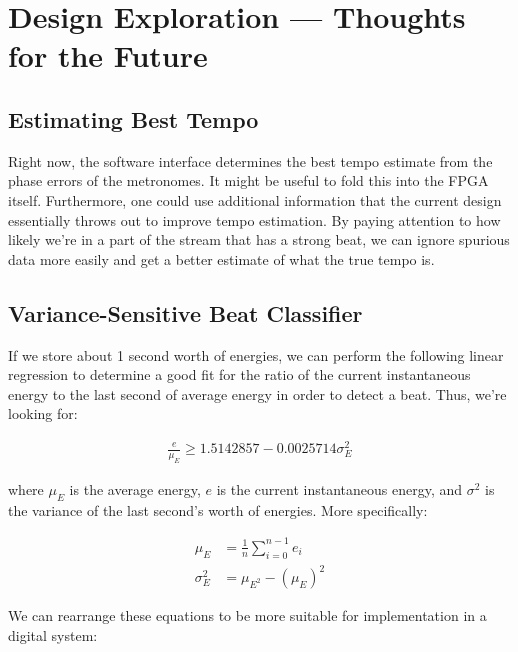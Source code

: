 \documentclass[letterpaper]{article}
\begin{document}
\section{Design Exploration --- Thoughts for the Future}
    \subsection{Estimating Best Tempo}
        Right now, the software interface determines the best tempo estimate
        from the phase errors of the metronomes.  It might be useful to fold
        this into the FPGA itself.  Furthermore, one could use additional
        information that the current design essentially throws out to improve
        tempo estimation.  By paying attention to how likely we're in a part of
        the stream that has a strong beat, we can ignore spurious data more
        easily and get a better estimate of what the true tempo is.

    \subsection{Variance-Sensitive Beat Classifier}
        
        If we store about 1 second worth of energies, we can perform the following
        linear regression to determine a good fit for the ratio of the current
        instantaneous energy to the last second of average energy in order to
        detect a beat.  Thus, we're looking for:

        \begin{align}
            \frac{e}{\mu_E} \geq 1.5142857 - 0.0025714 \sigma^2_E
        \end{align}

        where $\mu_E$ is the average energy, $e$ is the current instantaneous
        energy, and $\sigma^2$ is the variance of the last second's worth of
        energies.  More specifically:

        \begin{align}
            \mu_E &= \frac{1}{n} \sum_{i=0}^{n-1} e_i \\
            \sigma^2_E &= \mu_{E^2} - (\mu_E)^2
        \end{align}

        We can rearrange these equations to be more suitable for implementation in
        a digital system:
\end{document}
